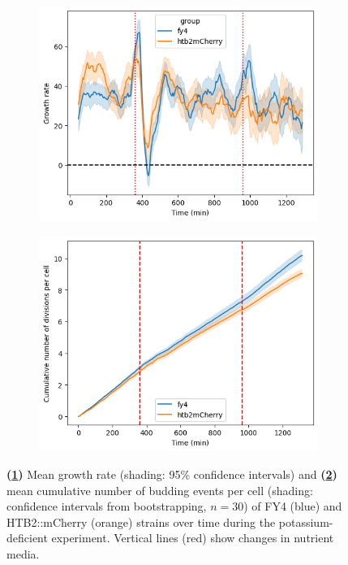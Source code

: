 \begin{figure}
  \centering
  \begin{subfigure}[htpb]{0.45\textwidth}
   \centering
   \includegraphics[width=\textwidth]{allstrains_613_gr}
   \caption{
   }
   \label{fig:biology-kdeficient-gr}
  \end{subfigure}%
  \begin{subfigure}[htpb]{0.45\textwidth}
   \centering
   \includegraphics[width=\textwidth]{allstrains_613_cumul}
   \caption{
   }
   \label{fig:biology-kdeficient-cumul}
  \end{subfigure}

  \caption{
    \textbf{(\ref{fig:biology-kdeficient-gr})}
    Mean growth rate (shading: 95\% confidence intervals) and
    \textbf{(\ref{fig:biology-kdeficient-cumul})}
    mean cumulative number of budding events per cell (shading: confidence intervals from bootstrapping, $n=30$)
    of FY4 (blue) and HTB2::mCherry (orange) strains over time during the potassium-deficient experiment.
    Vertical lines (red) show changes in nutrient media.
  }
  \label{fig:biology-kdeficient-gr-budprob}
\end{figure}


